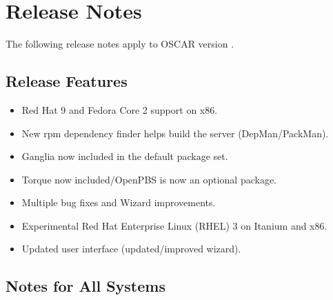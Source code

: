 %
% 
%
%

\section{Release Notes}
\label{sec:release-notes}

The following release notes apply to OSCAR version \oscarversion.
\subsection{Release Features}
\label{subsec:release-features}

\begin{itemize}

\item Red Hat 9 and Fedora Core 2 support on x86.
\item New rpm dependency finder helps build the server (DepMan/PackMan).
\item Ganglia now included in the default package set.
\item Torque now included/OpenPBS is now an optional package.
\item Multiple bug fixes and Wizard improvements.
\item Experimental Red Hat Enterprise Linux (RHEL) 3 on Itanium and x86.
\item Updated user interface (updated/improved wizard). 

\end{itemize}

\subsection{Notes for All Systems}
\label{subsec:release-notes}

